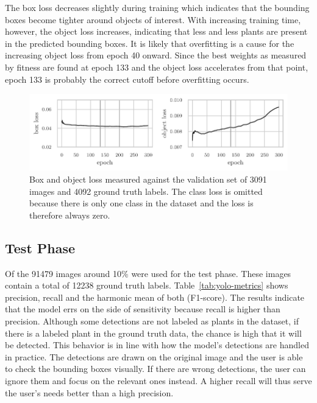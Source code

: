 \documentclass[draft,final]{vutinfth} %
\begin{document}
The box loss decreases slightly during training which indicates that
the bounding boxes become tighter around objects of interest. With
increasing training time, however, the object loss increases,
indicating that less and less plants are present in the predicted
bounding boxes. It is likely that overfitting is a cause for the
increasing object loss from epoch 40 onward. Since the best weights as
measured by fitness are found at epoch 133 and the object loss
accelerates from that point, epoch 133 is probably the correct cutoff
before overfitting occurs.

\begin{figure}
  \centering
  \includegraphics{graphics/val_box_obj_loss.pdf}
  \caption[Object detection box and object loss.]{Box and object loss
    measured against the validation set of 3091 images and 4092 ground
    truth labels. The class loss is omitted because there is only one
    class in the dataset and the loss is therefore always zero.}
  \label{fig:box-obj-loss}
\end{figure}

\subsection{Test Phase}
\label{ssec:yolo-test}

Of the 91479 images around 10\% were used for the test phase. These
images contain a total of 12238 ground truth
labels. Table~\ref{tab:yolo-metrics} shows precision, recall and the
harmonic mean of both (F1-score). The results indicate that the model
errs on the side of sensitivity because recall is higher than
precision. Although some detections are not labeled as plants in the
dataset, if there is a labeled plant in the ground truth data, the
chance is high that it will be detected. This behavior is in line with
how the model's detections are handled in practice. The detections are
drawn on the original image and the user is able to check the bounding
boxes visually. If there are wrong detections, the user can ignore
them and focus on the relevant ones instead. A higher recall will thus
serve the user's needs better than a high precision.
\end{document}
